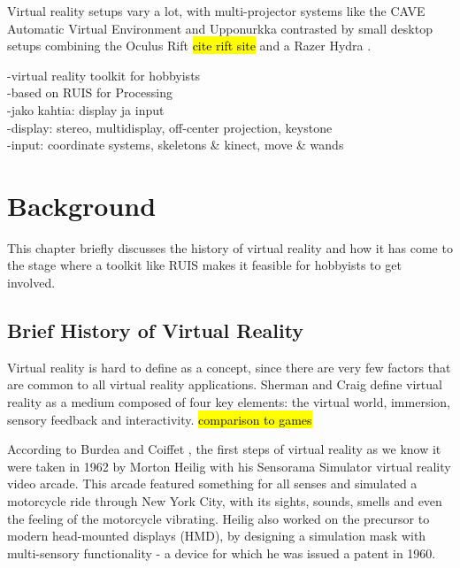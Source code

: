 \documentclass[12pt,a4paper,oneside,pdftex]{report}
\begin{document}
Virtual reality setups vary a lot, with multi-projector systems like the CAVE Automatic Virtual Environment \cite{CAVE1, CAVE2} and Upponurkka \cite{Upponurkka} contrasted by small desktop setups combining the Oculus Rift \hl{cite rift site} and a Razer Hydra \cite{RazerHydra}.


-virtual reality toolkit for hobbyists \\
-based on RUIS for Processing \\
-jako kahtia: display ja input \\
 -display: stereo, multidisplay, off-center projection, keystone \\
 -input: coordinate systems, skeletons & kinect, move & wands \\


% 




\chapter{Background}
\label{chapter:background}

This chapter briefly discusses the history of virtual reality and how it has come to the stage where a toolkit like RUIS makes it feasible for hobbyists to get involved.

\section{Brief History of Virtual Reality}
\label{section:historyofvr}

Virtual reality is hard to define as a concept, since there are very few factors that are common to all virtual reality applications. Sherman and Craig \cite{Sherman:2002:UVR:581839} define virtual reality as a medium composed of four key elements: the virtual world, immersion, sensory feedback and interactivity. \hl{comparison to games}

According to Burdea and Coiffet \cite{Burdea:2003:VRT:829566}, the first steps of virtual reality as we know it were taken in 1962 by Morton Heilig with his Sensorama Simulator virtual reality video arcade. This arcade featured something for all senses and simulated a motorcycle ride through New York City, with its sights, sounds, smells and even the feeling of the motorcycle vibrating. Heilig also worked on the precursor to modern head-mounted displays (HMD), by designing a simulation mask with multi-sensory functionality - a device for which he was issued a patent in 1960. 
\end{document}
